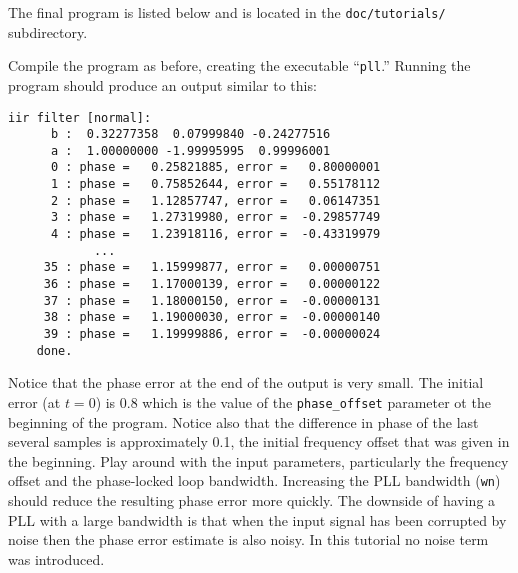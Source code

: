 The final program is listed below and is located in the
{\tt doc/tutorials/} subdirectory.
%

%
Compile the program as before, creating the executable ``{\tt pll}.''
Running the program should produce an output similar to this:
\begin{Verbatim}[fontsize=\small]
    iir filter [normal]:
      b :  0.32277358  0.07999840 -0.24277516
      a :  1.00000000 -1.99995995  0.99996001
      0 : phase =   0.25821885, error =   0.80000001
      1 : phase =   0.75852644, error =   0.55178112
      2 : phase =   1.12857747, error =   0.06147351
      3 : phase =   1.27319980, error =  -0.29857749
      4 : phase =   1.23918116, error =  -0.43319979
            ...
     35 : phase =   1.15999877, error =   0.00000751
     36 : phase =   1.17000139, error =   0.00000122
     37 : phase =   1.18000150, error =  -0.00000131
     38 : phase =   1.19000030, error =  -0.00000140
     39 : phase =   1.19999886, error =  -0.00000024
    done.
\end{Verbatim}
%
Notice that the phase error at the end of the output is very small.
The initial error (at $t=0$) is 0.8 which is the value of the
{\tt phase\_offset} parameter ot the beginning of the program.
Notice also that the difference in phase of the last several samples is
approximately 0.1, the initial frequency offset that was given in the
beginning.
Play around with the input parameters, particularly the frequency offset
and the phase-locked loop bandwidth.
Increasing the PLL bandwidth ({\tt wn}) should reduce the resulting
phase error more quickly.
The downside of having a PLL with a large bandwidth is that when the
input signal has been corrupted by noise then the phase error estimate
is also noisy.
In this tutorial no noise term was introduced. %

